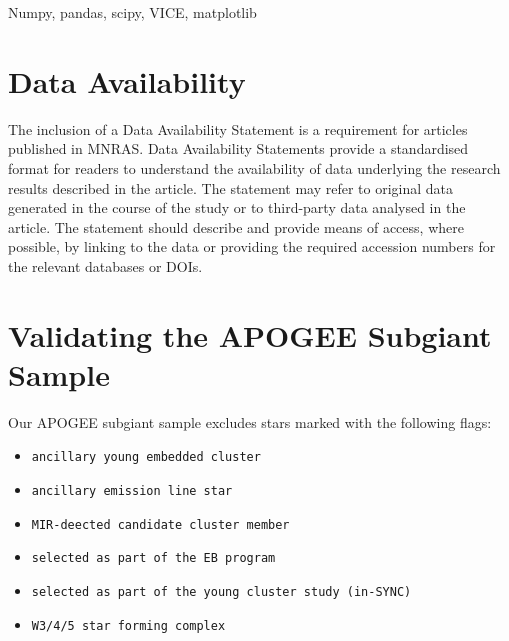 \documentclass[12pt,oneside]{book}
\begin{document}
Numpy, pandas, scipy, VICE, matplotlib
\cite{numpy, matplotlib}

\cite{OhioSupercomputerCenter1987}

\chapter*{Data Availability}

 
The inclusion of a Data Availability Statement is a requirement for articles published in MNRAS. Data Availability Statements provide a standardised format for readers to understand the availability of data underlying the research results described in the article. The statement may refer to original data generated in the course of the study or to third-party data analysed in the article. The statement should describe and provide means of access, where possible, by linking to the data or providing the required accession numbers for the relevant databases or DOIs.












\appendix

\chapter{Validating the APOGEE Subgiant Sample}\label{sec:jack}
Our APOGEE subgiant sample excludes stars marked with the following flags:
\begin{itemize}
\item \texttt{ancillary young embedded cluster}
\item \texttt{ancillary emission line star}
\item \texttt{MIR-deected candidate cluster member}
\item \texttt{selected as part of the EB program}
\item \texttt{selected as part of the young cluster study (in-SYNC)}
\item \texttt{W3/4/5 star forming complex}
\end{itemize}
\end{document}
